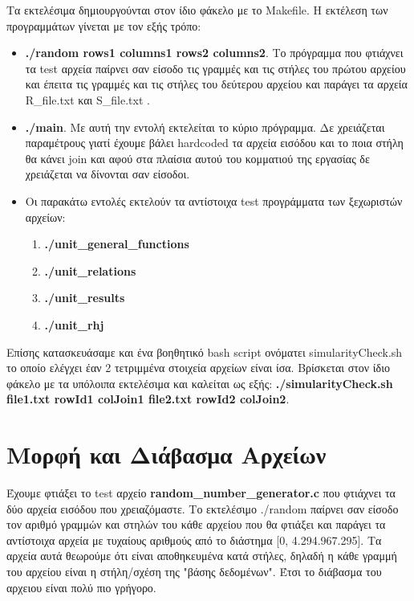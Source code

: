 \documentclass[12pt, a4paper]{article}
\begin{document}
Τα εκτελέσιμα δημιουργούνται στον ίδιο φάκελο με το Makefile. Η εκτέλεση των προγραμμάτων γίνεται με τον εξής τρόπο:
\begin{itemize}
	\item \textbf{./random rows1 columns1 rows2 columns2}. Το πρόγραμμα που φτιάχνει τα test αρχεία παίρνει σαν είσοδο τις γραμμές και τις στήλες του πρώτου αρχείου και έπειτα τις γραμμές και τις στήλες του δεύτερου αρχείου και παράγει τα αρχεία R\_file.txt και S\_file.txt .
	\item \textbf{./main}. Με αυτή την εντολή εκτελείται το κύριο πρόγραμμα. Δε χρειάζεται παραμέτρους γιατί έχουμε βάλει hardcoded τα αρχεία εισόδου και το ποια στήλη θα κάνει join και αφού στα πλαίσια αυτού του κομματιού της εργασίας δε χρειάζεται να δίνονται σαν είσοδοι.
	\item Οι παρακάτω εντολές εκτελούν τα αντίστοιχα test προγράμματα των ξεχωριστών αρχείων: 
		\begin{enumerate}
			\item \textbf{./unit\_general\_functions}
			\item \textbf{./unit\_relations}
			\item \textbf{./unit\_results}
			\item \textbf{./unit\_rhj}
		\end{enumerate}
\end{itemize}
Επίσης κατασκευάσαμε και ένα βοηθητικό bash script ονόματει simularityCheck.sh το οποίο ελέγχει έαν 2 τετριμμένα στοιχεία αρχείων είναι ίσα. Βρίσκεται στον ίδιο φάκελο με τα υπόλοιπα εκτελέσιμα και καλείται ως εξής: \textbf{./simularityCheck.sh file1.txt rowId1 colJoin1 file2.txt rowId2 colJoin2}.

\section{Μορφή και Διάβασμα Αρχείων}
Έχουμε φτιάξει το test αρχείο \textbf{random\_number\_generator.c} που φτιάχνει τα δύο αρχεία εισόδου που χρειαζόμαστε. Το εκτελέσιμο ./random παίρνει σαν είσοδο τον αριθμό γραμμών και στηλών του κάθε αρχείου που θα φτιάξει και παράγει τα αντίστοιχα αρχεία με τυχαίους αριθμούς από το διάστημα [0, 4.294.967.295]. Τα αρχεία αυτά θεωρούμε ότι είναι αποθηκευμένα κατά στήλες, δηλαδή η κάθε γραμμή του αρχείου είναι η στήλη/σχέση της "βάσης δεδομένων". Έτσι το διάβασμα του αρχειου είναι πολύ πιο γρήγορο.
\end{document}
